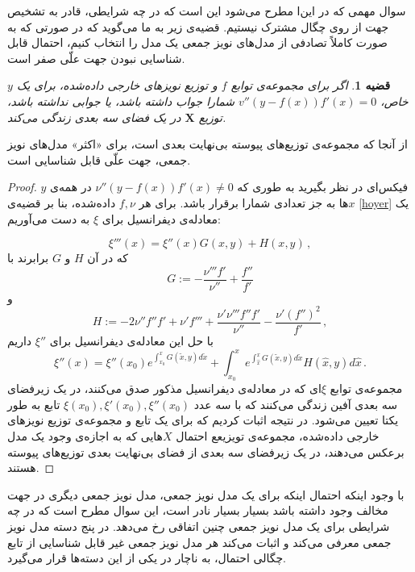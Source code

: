 \documentclass[a4paper,12pt]{article}
\newtheorem{thm}{{\large\bf قضیه}}[section]
\def\hat{\widehat}
\begin{document}
سوال مهمی که در این‌ا مطرح می‌شود این است که در چه شرایطی، قادر به تشخیص جهت از روی چگال مشترک نیستیم. قضیه‌ی زیر به ما می‌گوید که در صورتی که به صورت کاملاً تصادفی از مدل‌های نویز جمعی یک مدل را انتخاب کنیم، احتمال قابل شناسایی نبودن جهت علّی صفر است.

\begin{thm}
	اگر برای مجموعه‌ی توابع $f$ و توزیع نویز‌های خارجی داده‌شده، برای یک $y$ خاص،
	$v''(y-f(x))f'(x)=0$
	شمارا جواب داشته باشد، یا جوابی نداشته باشد، توزیع 
	$\textbf{X}$
	در یک فضای سه بعدی زندگی می‌کند.
\end{thm}
از آنجا که مجموعه‌ی توزیع‌های پیوسته بی‌نهایت بعدی است، برای «اکثر»  مدل‌‌های نویز جمعی، جهت علّی قابل شناسایی است.
\vspace{0.5cm}
\begin{proof}
	$y$ 
	فیکس‌ای در نظر بگیرید به طوری که 
	$\nu''(y-f(x))f'(x)\neq 0$ 
	در همه‌ی $x$ها به جز تعدادی شمارا برقرار باشد. برای هر $f,\nu$ داده‌شده، بنا بر قضیه‌ی 
	\ref{hoyer}
	یک معادله‌ی دیفرانسیل برای $\xi$ به دست می‌آوریم:
	
	\begin{equation}\label{DGLmitG}
	\xi'''(x)=\xi''(x) G(x,y) +H(x,y)  \,,
	\end{equation}
	که در آن $H$ و $G$ برابرند با
	$$
	G:= -\frac{\nu'''f'}{\nu''}+\frac{f''}{f'}
	$$
	و
	$$ 
	H:= -2\nu''f''f' +\nu'f'''+\frac{\nu'\nu'''f''f'}{\nu''}-\frac{\nu'(f'')^2}{f'} \,,
	$$
	با حل این معادله‌ی دیفرانسیل برای $\xi''$ داریم
	\begin{equation}\label{rInt}
	\xi''(x)=\xi''(x_0) e^{\int_{x_0}^x G(\tilde{x},y) d\tilde{x}}	
	+\int_{x_0}^x  e^{\int_{\hat{x}}^x G(\tilde{x},y)d\tilde{x}} 
	H(\hat{x},y) d\hat{x}\,.
	\end{equation}
	مجموعه‌ی توابع $\xi$ای که در معادله‌ی دیفرانسیل مذکور صدق می‌کنند، در یک زیرفضای سه بعدی آفین زندگی می‌کنند که با سه عدد 
	$\xi(x_0),\xi'(x_0),\xi''(x_0)$ 
	تابع به طور یکتا تعیین می‌شود. در نتیجه اثبات کردیم که برای یک تابع و مجموعه‌ی توزیع نویز‌های خارجی داده‌شده، مجموعه‌ی تویزیعع احتمال $X$هایی که به اجازه‌ی وجود یک مدل برعکس می‌دهند، در یک زیرفضای سه بعدی از فضای بی‌نهایت بعدی توزیع‌های پیوسته هستند.
\end{proof}
با وجود اینکه احتمال اینکه برای یک مدل نویز جمعی، مدل نویز جمعی دیگری در جهت مخالف وجود داشته باشد بسیار بسیار نادر است، این سوال مطرح است که در چه شرایطی برای یک مدل نویز جمعی چنین اتفاقی رخ می‌دهد.
در 
\cite{postnonlinear}
پنج دسته مدل نویز جمعی معرفی می‌کند و اثبات می‌کند هر مدل نویز جمعی غیر قابل شناسایی از تابع چگالی احتمال، به ناچار در یکی از این دسته‌ها قرار می‌گیرد.
\end{document}
